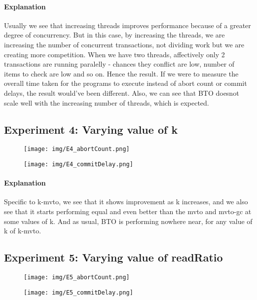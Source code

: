 \documentclass[10pt]{article}
\begin{document}
\paragraph{Explanation}
Usually we see that increasing threads improves performance because of a greater degree of concurrency. But in this case, by increasing the threads, we are increasing the number of concurrent transactions, not dividing work but we are creating more competition. When we have two threads, affectively only 2 transactions are running paralelly - chances they conflict are low, number of items to check are low and so on. Hence the result. If we were to measure the overall time taken for the programs to execute instead of abort count or commit delays, the result would've been different. Also, we can see that BTO doesnot scale well with the increasing number of threads, which is expected.


\subsection{Experiment 4: Varying value of k}
\begin{figure}[h]
    \centering
    \texttt{[image: img/E4\_abortCount.png]}
\end{figure}

\begin{figure}[h]
    \centering
    \texttt{[image: img/E4\_commitDelay.png]}
\end{figure}

\paragraph{Explanation}
Specific to k-mvto, we see that it shows improvement as k increases, and we also see that it starts performing equal and even better than the mvto and mvto-gc at some values of k. And as usual, BTO is performing nowhere near, for any value of k of k-mvto.



\subsection{Experiment 5: Varying value of readRatio}
\begin{figure}[h]
    \centering
    \texttt{[image: img/E5\_abortCount.png]}
\end{figure}

\begin{figure}[h]
    \centering
    \texttt{[image: img/E5\_commitDelay.png]}
\end{figure}
\end{document}
